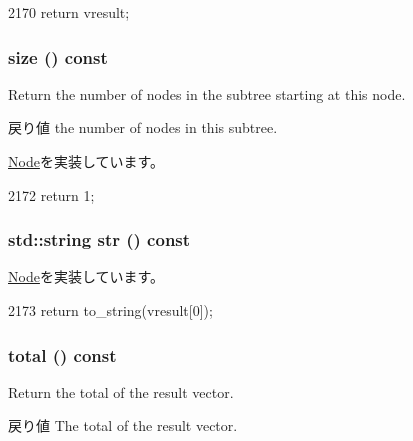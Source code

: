 \begin{DoxyCode}
2170 { return vresult; }
\end{DoxyCode}
\hypertarget{classStats_1_1ConstNode_a503ab01f6c0142145d3434f6924714e7}{
\subsubsection[{size}]{ size () const}}
\label{classStats_1_1ConstNode_a503ab01f6c0142145d3434f6924714e7}
Return the number of nodes in the subtree starting at this node. \begin{DoxyReturn}{戻り値}
the number of nodes in this subtree. 
\end{DoxyReturn}


\hyperlink{classStats_1_1Node_a4051d143efd31726fa13df03ae4e1bce}{Node}を実装しています。


\begin{DoxyCode}
2172 { return 1; }
\end{DoxyCode}
\hypertarget{classStats_1_1ConstNode_a1b9b8885b0880fc4ddf9a2c7d1ca3dc4}{
\subsubsection[{str}]{\setlength{\rightskip}{0pt plus 5cm}std::string str () const}}
\label{classStats_1_1ConstNode_a1b9b8885b0880fc4ddf9a2c7d1ca3dc4}


\hyperlink{classStats_1_1Node_a6522bc65bd97a6b1ef6cdfe78462a919}{Node}を実装しています。


\begin{DoxyCode}
2173 { return to_string(vresult[0]); }
\end{DoxyCode}
\hypertarget{classStats_1_1ConstNode_a35c6e2ed3fc81b40d69052a062113ead}{
\subsubsection[{total}]{ total () const}}
\label{classStats_1_1ConstNode_a35c6e2ed3fc81b40d69052a062113ead}
Return the total of the result vector. \begin{DoxyReturn}{戻り値}
The total of the result vector. 
\end{DoxyReturn}



